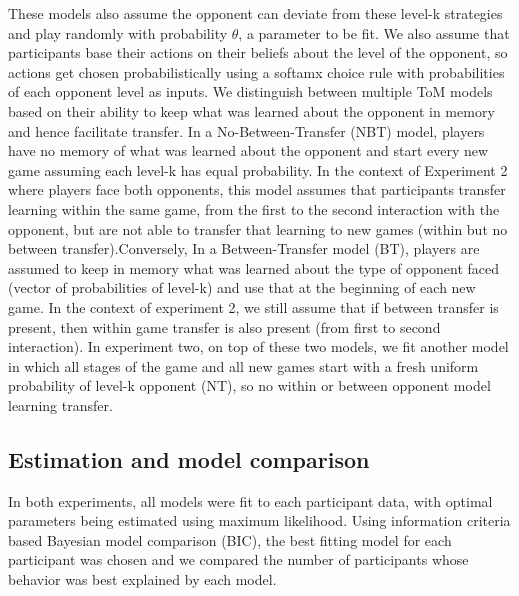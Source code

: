 \documentclass[man,floatsintext]{apa6}
\begin{document}
These models also assume the opponent can deviate from these level-k strategies and play randomly with probability \(\theta\), a parameter to be fit. We also assume that participants base their actions on their beliefs about the level of the opponent, so actions get chosen probabilistically using a softamx choice rule with probabilities of each opponent level as inputs. We distinguish between multiple ToM models based on their ability to keep what was learned about the opponent in memory and hence facilitate transfer. In a No-Between-Transfer (NBT) model, players have no memory of what was learned about the opponent and start every new game assuming each level-k has equal probability. In the context of Experiment 2 where players face both opponents, this model assumes that participants transfer learning within the same game, from the first to the second interaction with the opponent, but are not able to transfer that learning to new games (within but no between transfer).Conversely, In a Between-Transfer model (BT), players are assumed to keep in memory what was learned about the type of opponent faced (vector of probabilities of level-k) and use that at the beginning of each new game. In the context of experiment 2, we still assume that if between transfer is present, then within game transfer is also present (from first to second interaction). In experiment two, on top of these two models, we fit another model in which all stages of the game and all new games start with a fresh uniform probability of level-k opponent (NT), so no within or between opponent model learning transfer.

\hypertarget{estimation-and-model-comparison}{%
\subsection{Estimation and model comparison}\label{estimation-and-model-comparison}}

In both experiments, all models were fit to each participant data, with optimal parameters being estimated using maximum likelihood. Using information criteria based Bayesian model comparison (BIC), the best fitting model for each participant was chosen and we compared the number of participants whose behavior was best explained by each model.
\end{document}
